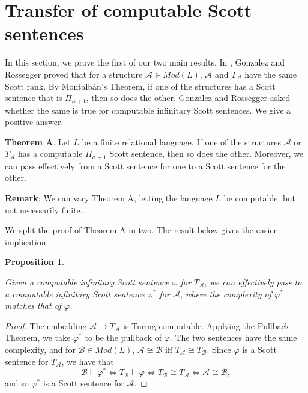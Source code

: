 \documentclass{article}
\newtheorem{prop}[thm]{Proposition}
\begin{document}
\section{Transfer of computable Scott sentences}

In this section, we prove the first of our two main results.  In \cite{GR}, Gonzalez and Rossegger proved that for a structure $\mathcal{A}\in Mod(L)$, $\mathcal{A}$ and $T_\mathcal{A}$ have the same Scott rank. By Montalb\'{a}n's Theorem, if one of the structures has a Scott sentence that is $\Pi_{\alpha+1}$, then so does the other.  Gonzalez and Rossegger asked whether the same is true for computable infinitary Scott sentences.  We give a positive answer. 

\bigskip
\noindent
\textbf{Theorem A}.  Let $L$ be a finite relational language.  If one of the structures $\mathcal{A}$ or $T_\mathcal{A}$ has a computable $\Pi_{\alpha+1}$ Scott sentence, then so does the other.  Moreover, we can pass effectively from a Scott sentence for one to a Scott sentence for the other.      

\bigskip
\noindent
\textbf{Remark}:  We can vary Theorem A, letting the language $L$ be computable, but not necessarily finite.  

\bigskip

We split the proof of Theorem A in two.  The result below gives the easier implication.   

\begin{prop}
\label{Prop7}

Given a computable infinitary Scott sentence $\varphi$ for $T_\mathcal{A}$, we can effectively pass to a computable infinitary Scott sentence $\varphi^*$ for $\mathcal{A}$, where the complexity of $\varphi^*$ matches that of $\varphi$.  

\end{prop}

\begin{proof}

The embedding $\mathcal{A}\rightarrow T_\mathcal{A}$ is Turing computable.  Applying the Pullback Theorem, we take $\varphi^*$ to be the pullback of $\varphi$.  The two sentences have the same complexity, and for $\mathcal{B}\in Mod(L)$, $\mathcal{A}\cong\mathcal{B}$ iff $T_\mathcal{A}\cong T_\mathcal{B}$.  Since $\varphi$ is a Scott sentence for $T_\mathcal{A}$, we have that
\[\mathcal{B}\models\varphi^*\iff T_\mathcal{B}\models\varphi\iff T_\mathcal{B}\cong T_\mathcal{A}\iff \mathcal{A}\cong\mathcal{B},\]
and so $\varphi^*$ is a Scott sentence for $\mathcal{A}$.          
\end{proof} 
\end{document}
